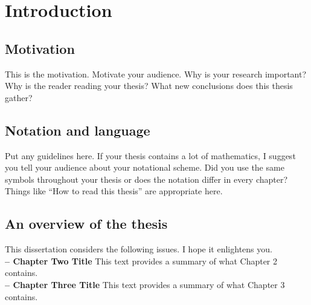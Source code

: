 


\chapter{Introduction}
\doublespacing

\section{Motivation}
\label{sec:intro:motivation}
This is the motivation. Motivate your audience.
Why is your research important? Why is the reader reading your thesis?
What new conclusions does this thesis gather?

\section{Notation and language}
\label{sec:intro:notation}
Put any guidelines here. If your thesis contains a lot of mathematics,
I suggest you tell your audience about your notational scheme. Did you use the
same symbols throughout your thesis or does the notation differ in every chapter? \\

Things like ``How to read this thesis'' are appropriate here.


\section{An overview of the thesis}
\label{sec:intro:overview}
This dissertation considers the following issues. I hope it enlightens you. \\

\noindent \textbf{\chaptertwoname{} -- Chapter Two Title}
This text provides a summary of what Chapter 2 contains. \\


\noindent \textbf{\chapterthreename{} -- Chapter Three Title}
This text provides a summary of what Chapter 3 contains. \\


